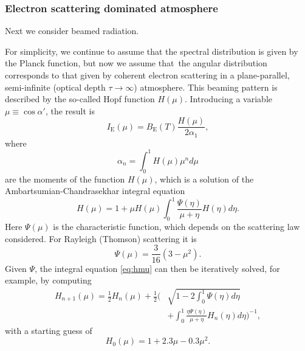 \documentclass{aa}
\newcommand{\refe}[1]{#1}
\newcommand{\refedel}[1]{}
\begin{document}
\subsubsection{Electron scattering dominated atmosphere}

\refe{Next we consider beamed radiation.}
\refedel{The second angular distribution we consider is the so-called `Hopf profile', which is no longer isotropic.}
\refe{For simplicity, we continue to assume that} the spectral distribution is given by the Planck function, but \refe{now we assume that} the angular distribution \refe{corresponds to that given by} coherent electron scattering \refe{in a} plane-parallel, semi-infinite (optical depth $\tau \rightarrow \infty$) atmosphere.
\refe{This beaming pattern is described by the so-called Hopf function $H(\mu)$.}
\refe{Introducing a variable $\mu \equiv \cos\alpha'$, the result is}
\begin{equation}\label{eq:hopf}
  I_{\mathrm{E}}(\mu) = B_{\mathrm{E}}(T) \frac{H(\mu)}{2\alpha_1},
\end{equation}
where
\begin{equation}
  \alpha_n = \int_0^1 H(\mu) \mu^n d\mu
\end{equation}
are the moments of the function $H(\mu)$, which is a solution of the Ambartsumian-Chandrasekhar integral equation \citep[see e.g.][]{Cha60,Sob63}
\begin{equation}\label{eq:hmu}
  H(\mu) = 1 + \mu H(\mu) \int_0^1 \frac{\Psi(\eta)}{\mu + \eta} H(\eta) d\eta.
\end{equation}
Here $\Psi(\mu)$ is the characteristic function, which depends on the scattering law considered.
For Rayleigh (Thomson) scattering it is
\begin{equation}
  \Psi(\mu) = \frac{3}{16}(3-\mu^2).
\end{equation}
Given $\Psi$, the integral equation \eqref{eq:hmu} can then be iteratively solved, for example, by computing
\begin{equation}\begin{split}
    H_{n+1}(\mu) =  \frac{1}{2} H_n(\mu) + \frac{1}{2}\Biggl(& \sqrt{1-2\int_0^1 \Psi(\eta)d\eta} \\
                    &+ \int_0^1 \frac{\eta \Psi(\eta)}{\mu + \eta} H_n(\eta) d\eta \Biggr)^{-1},
\end{split}\end{equation}
with a starting guess of
\begin{equation}\label{eq:apprx_hopf}
  H_0(\mu) = 1 + 2.3\mu - 0.3\mu^2.
\end{equation}
\end{document}
